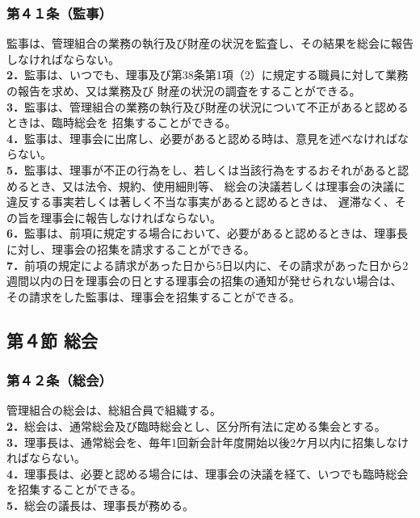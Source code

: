 \documentclass[
  luatex,
  paper=a4paper,
  fontsize=11pt,
  jafontsize=11pt,
  jlreq_notes,
]{jlreq}
\begin{document}
  \subsubsection*{第４１条（監事）}
  監事は、管理組合の業務の執行及び財産の状況を監査し、その結果を総会に報告しなければならない。\\
  \textbf{2．}監事は、いつでも、理事及び第38条第1項（2）に規定する職員に対して業務の報告を求め、又は業務及び
  財産の状況の調査をすることができる。\\
  \textbf{3．}監事は、管理組合の業務の執行及び財産の状況について不正があると認めるときは、臨時総会を
  招集することができる。\\
  \textbf{4．}監事は、理事会に出席し、必要があると認める時は、意見を述べなければならない。\\
  \textbf{5．}監事は、理事が不正の行為をし、若しくは当該行為をするおそれがあると認めるとき、又は法令、規約、使用細則等、
  総会の決議若しくは理事会の決議に違反する事実若しくは著しく不当な事実があると認めるときは、 遅滞なく、その旨を理事会に報告しなければならない。\\
  \textbf{6．}監事は、前項に規定する場合において、必要があると認めるときは、理事長に対し、理事会の招集を請求することができる。\\
  \textbf{7．}前項の規定による請求があった日から5日以内に、その請求があった日から2週間以内の日を理事会の日とする理事会の招集の通知が発せられない場合は、
  その請求をした監事は、理事会を招集することができる。
  \begin{center}
  \subsection*{第４節 総会}
  \end{center}
  \subsubsection*{第４２条（総会）}
  管理組合の総会は、総組合員で組織する。\\
  \textbf{2．}総会は、通常総会及び臨時総会とし、区分所有法に定める集会とする。\\
  \textbf{3．}理事長は、通常総会を、毎年1回新会計年度開始以後2ケ月以内に招集しなければならない。\\
  \textbf{4．}理事長は、必要と認める場合には、理事会の決議を経て、いつでも臨時総会を招集することができる。\\
  \textbf{5．}総会の議長は、理事長が務める。
  
\end{document}
